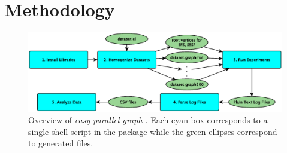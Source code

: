 \documentclass[conference]{IEEEtran}
\begin{document}



\section{Methodology}\label{sec:meth}

\begin{figure}
	\centering
	\includegraphics[width=\linewidth, trim=0 144pt 0pt 156pt, clip]{graphics/overview.eps}
	\caption{Overview of \emph{easy-parallel-graph-\textasteriskcentered}. Each cyan box corresponds to a single shell script in the package while the green ellipses correspond to generated files.}
	\label{fig:epg-overview}
\end{figure}
\end{document}
